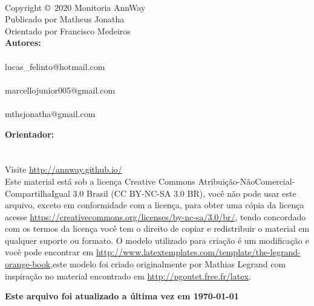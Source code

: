 \newpage
~\vfill
\thispagestyle{empty}

\noindent Copyright \copyright\ 2020 Monitoria AnnWay\\ %

\noindent Publicado por Matheus Jonatha\\ %
\noindent Orientado por Francisco Medeiros\\ %

\noindent\textbf{Autores:}\\
\\ %
\noindent lucas\_felinto@hotmail.com\\
\\ %
\noindent marcellojunior005@gmail.com\\
\\ %
\noindent mthsjonatha@gmail.com

\noindent \textbf{Orientador:}\\
\\
\\
\noindent Visite \url{http://annway.github.io/}\\ %

\noindent Este material está sob a licença Creative Commons Atribuição-NãoComercial-CompartilhaIgual 3.0 Brasil (CC BY-NC-SA 3.0 BR), você não pode usar este arquivo, exceto em conformidade com a licença, para obter uma cópia da licença acesse \url{https://creativecommons.org/licenses/by-nc-sa/3.0/br/}, tendo concordado com os termos da licença você tem o direito de copiar e redistribuir o material em qualquer suporte ou formato. O modelo utilizado para criação é um modificação e você pode encontrar em \url{http://www.latextemplates.com/template/the-legrand-orange-book},este modelo foi criado originalmente por Mathias Legrand com inspiração no material encontrado em \url{http://pgoutet.free.fr/latex}.

\vspace{1cm}
\noindent \textbf{Este arquivo foi atualizado a última vez em \today}
